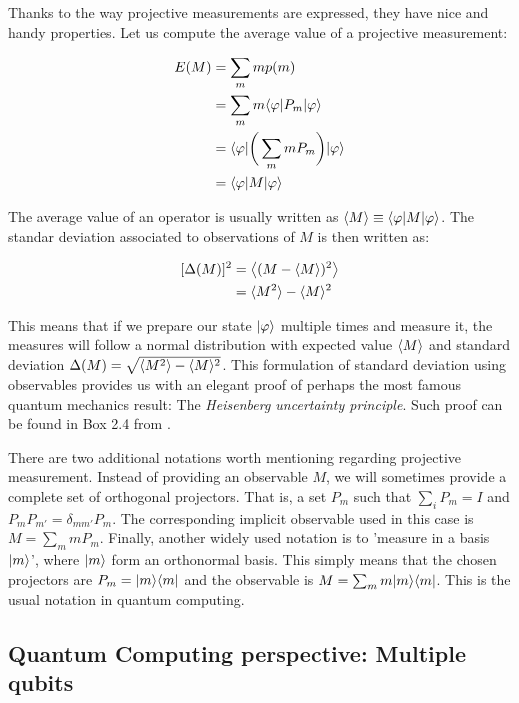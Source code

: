 Thanks to the way projective measurements are expressed, they have nice and handy properties. Let us compute the average value of a projective measurement:

\begin{equation}
	\begin{split}
		E(M)	& = \sum_m m p(m) \\
				& = \sum_m m \langle \varphi | P_m | \varphi \rangle \\
				& = \langle \varphi | \bigg( \sum_m m P_m \bigg) | \varphi \rangle \\
				& = \langle \varphi | M | \varphi \rangle
	\end{split}
\end{equation}

The average value of an operator is usually written as $\langle M \rangle \equiv \langle \varphi | M | \varphi \rangle$. The standar deviation associated to observations of $M$ is then written as:

\begin{equation}
	\begin{split}
	[\Delta(M)]^2	& = \big\langle (M - \langle M \rangle )^2 \big\rangle\\
					& = \langle M^2 \rangle - \langle M \rangle^2
	\end{split}
\end{equation}

This means that if we prepare our state $|\varphi\rangle$ multiple times and measure it, the measures will follow a normal distribution with expected value $\langle M \rangle$ and standard deviation $\Delta(M) = \sqrt{\langle M^2 \rangle - \langle M \rangle^2}$. This formulation of standard deviation using observables provides us with an elegant proof of perhaps the most famous quantum mechanics result: The \emph{Heisenberg uncertainty principle}. Such proof can be found in Box 2.4 from \cite{Nielsen2002}.

There are two additional notations worth mentioning regarding projective measurement. Instead of providing an observable $M$, we will sometimes provide a complete set of orthogonal projectors. That is, a set $P_m$ such that $\sum_i P_m = I$ and $P_m P_{m'} = \delta_{mm'} P_m$. The corresponding implicit observable used in this case is $M = \sum_m m P_m$. Finally, another widely used notation is to 'measure in a basis $|m\rangle$', where $|m\rangle$ form an orthonormal basis. This simply means that the chosen projectors are  $P_m = |m \rangle\langle m|$ and the observable is $M = \sum_m m |m \rangle\langle m|$. This is the usual notation in quantum computing.


\subsection{Quantum Computing perspective: Multiple qubits}


